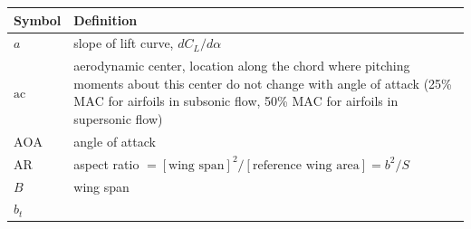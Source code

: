 \documentclass[
]{book}
\begin{document}
\begin{longtable}[]{@{}ll@{}}
\toprule
\begin{minipage}[b]{0.22\columnwidth}\raggedright
Symbol\strut
\end{minipage} & \begin{minipage}[b]{0.72\columnwidth}\raggedright
Definition\strut
\end{minipage}\tabularnewline
\midrule
\endhead
\begin{minipage}[t]{0.22\columnwidth}\raggedright
\(a\)\strut
\end{minipage} & \begin{minipage}[t]{0.72\columnwidth}\raggedright
slope of lift curve, \(dC_L/d\alpha\)\strut
\end{minipage}\tabularnewline
\begin{minipage}[t]{0.22\columnwidth}\raggedright
\(\mathrm{ac}\)\strut
\end{minipage} & \begin{minipage}[t]{0.72\columnwidth}\raggedright
aerodynamic center, location along the chord where pitching moments about this center do not change with angle of attack (25\% \(\mathrm{MAC}\) for airfoils in subsonic flow, 50\% \(\mathrm{MAC}\) for airfoils in supersonic flow)\strut
\end{minipage}\tabularnewline
\begin{minipage}[t]{0.22\columnwidth}\raggedright
\(\mathrm{AOA}\)\strut
\end{minipage} & \begin{minipage}[t]{0.72\columnwidth}\raggedright
angle of attack\strut
\end{minipage}\tabularnewline
\begin{minipage}[t]{0.22\columnwidth}\raggedright
\(\mathrm{AR}\)\strut
\end{minipage} & \begin{minipage}[t]{0.72\columnwidth}\raggedright
aspect ratio \(= [\text{wing span}]^2 / [\text{reference wing area}] = b^2/S\)\strut
\end{minipage}\tabularnewline
\begin{minipage}[t]{0.22\columnwidth}\raggedright
\(B\)\strut
\end{minipage} & \begin{minipage}[t]{0.72\columnwidth}\raggedright
wing span\strut
\end{minipage}\tabularnewline
\begin{minipage}[t]{0.22\columnwidth}\raggedright
\(b_t\)\strut
\end{minipage} & \begin{minipage}[t]{0.72\columnwidth}\raggedright

\end{minipage}
\end{longtable}
\end{document}
